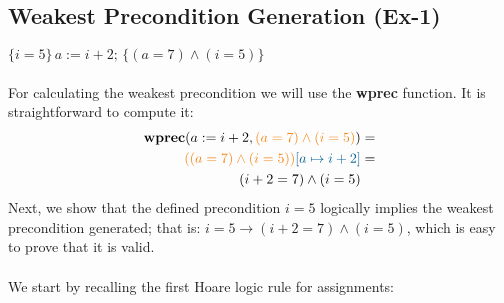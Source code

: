 \documentclass[11pt]{article}
\newcommand{\horange}[1]{{\color{BurntOrange}{#1}}}
\newcommand{\hblue}[1]{{\color{MidnightBlue}{#1}}}
\begin{document}
\subsection*{Weakest Precondition Generation (Ex-1)}

 $\{i = 5\}\,a := i + 2;\,\{(a = 7) \land (i = 5)\}$\\\vspace{0.3cm}\\
For calculating the weakest precondition we will use the \textbf{wprec} function. It is straightforward to compute it:
\begin{align*}
  \textbf{wprec}(a := i + 2,\horange{(a = 7) \land (i = 5)}) & =\\
  \horange{((a = 7) \land (i = 5))}\hblue{[a \mapsto i + 2]} & =\\
  (i + 2 = 7) \land (i = 5)
\end{align*}
Next, we show that the defined precondition $i=5$ logically implies the weakest precondition generated; that is: $i = 5 \to (i + 2 = 7) \land (i = 5)$, which is easy to prove that it is valid.\\\vspace{0.2cm}\\\textbf{{\color{red}{Digression on Hoare Logic rules:}}} We start by recalling the first Hoare logic rule for assignments:\\
\end{document}
